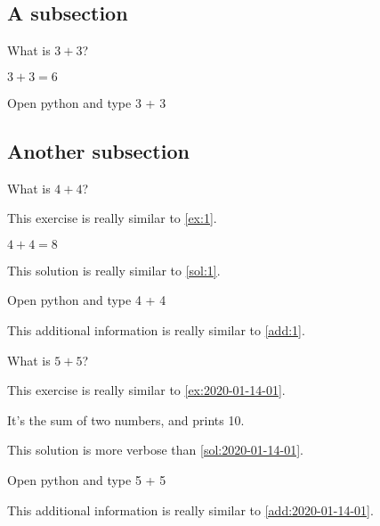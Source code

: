 \documentclass[oneside]{book}
\begin{document}
\subsection{A subsection}

\begin{exercise}[examdate={January 14, 2020}, examproblemnumber={1}, examproblemid={2020-01-14-01}]
  What is \(3 + 3\)?
\end{exercise}

\begin{solution}
  \(3 + 3 = 6\)
\end{solution}

\begin{additionalinformation}
Open python and type 3 + 3
\end{additionalinformation}

\subsection{Another subsection}

\begin{exercise}
  What is \(4 + 4\)?

  This exercise is really similar to \cref{ex:1}.
\end{exercise}

\begin{solution}
  \(4 + 4 = 8\)

  This solution is really similar to \cref{sol:1}.
\end{solution}

\begin{additionalinformation}
Open python and type 4 + 4

This additional information is really similar to \cref{add:1}.
\end{additionalinformation}

\begin{exercise}[examdate={January 15, 2020}, examproblemnumber={1}, examproblemid={2020-01-15-01}]
  What is \(5 + 5\)?

  This exercise is really similar to \cref{ex:2020-01-14-01}.
\end{exercise}

\begin{solution}
It's the sum of two numbers, and prints 10.

This solution is more verbose than \cref{sol:2020-01-14-01}.
\end{solution}

\begin{additionalinformation}
Open python and type 5 + 5

This additional information is really similar to \cref{add:2020-01-14-01}.
\end{additionalinformation}
\end{document}
